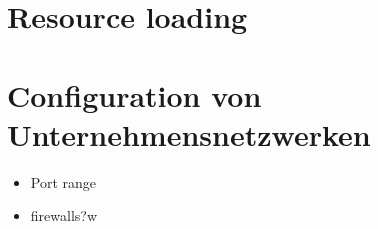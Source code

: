
\section{Resource loading}

\section{ Configuration von Unternehmensnetzwerken }

\begin{itemize}
	\item Port range
	\item firewalls?w
\end{itemize}